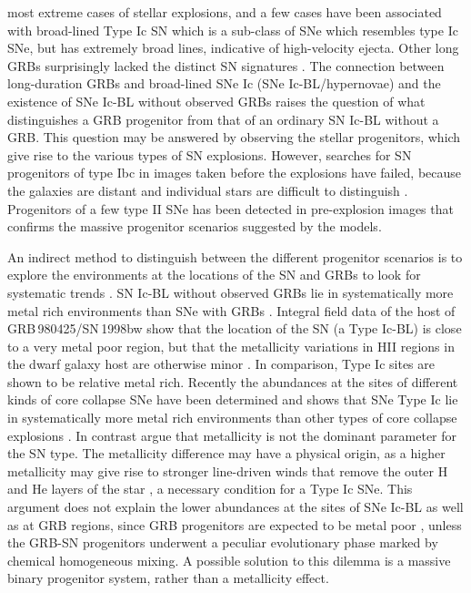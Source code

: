most
extreme cases of stellar explosions, and a few cases have been associated
with broad-lined Type Ic SN \citep{Woosley2006} which is a sub-class of SNe
which resembles type Ic SNe, but has extremely broad lines, indicative of
high-velocity ejecta. Other long GRBs
  surprisingly lacked the distinct SN
signatures \citep{Fynbo2006}. The connection between long-duration GRBs and
broad-lined SNe Ic (SNe Ic-BL/hypernovae) and the existence of SNe Ic-BL without
observed
GRBs raises the question of what distinguishes a GRB progenitor from
that of an ordinary SN Ic-BL without a GRB. This question may be answered by
observing the stellar progenitors, which give rise to
  the various types of SN
explosions. However, searches for SN
  progenitors of type Ibc in images taken
before the explosions have failed,
  because the galaxies are distant and
individual stars are difficult
  to distinguish \citep{Maund2005}. Progenitors
of a few type II SNe has been detected in pre-explosion images \cite{VanDyk2012}
that confirms the massive progenitor scenarios suggested by the models. 

An indirect method to distinguish between the different progenitor scenarios is
to explore the environments at
the locations of the SN and GRBs to look for
systematic trends \citep{Levesque2014}. SN
Ic-BL without observed GRBs lie in
systematically more metal rich
environments than SNe with GRBs
\citep{Modjaz2008, Graham2013}. Integral field data of the host
of
GRB\,980425/SN\,1998bw show that the location of the SN (a Type
Ic-BL) is close
to a very metal poor region, but that the metallicity
variations in HII regions
in the dwarf galaxy host are otherwise minor
\citep{Christensen2008}.  In
comparison, Type Ic sites are shown to be relative
metal rich. Recently the
abundances at the sites of different kinds of
core collapse SNe have been
determined and shows that SNe Type Ic lie
in systematically more metal rich
environments than other types of
core collapse explosions \citep{Modjaz2011,
Leloudas2011, Kuncarayakti2013a, Kelly2012}.  In contrast \citet{Anderson2010}
argue
that metallicity is not the dominant parameter for the SN type. The
metallicity difference may have a physical origin, as a higher
metallicity may
give rise to stronger line-driven winds that remove
the outer H and He layers of
the star \cite{Vink2005}, a necessary condition for
a Type Ic SNe. This argument
does not explain the lower abundances at
the sites of SNe Ic-BL as well as at
GRB regions, since GRB
progenitors are expected to be metal poor
\citep{Woosley1993}, unless the GRB-SN
progenitors underwent a peculiar
evolutionary phase marked by chemical
homogeneous mixing. A possible solution to
this dilemma is a massive
binary progenitor system, rather than a metallicity
effect.

